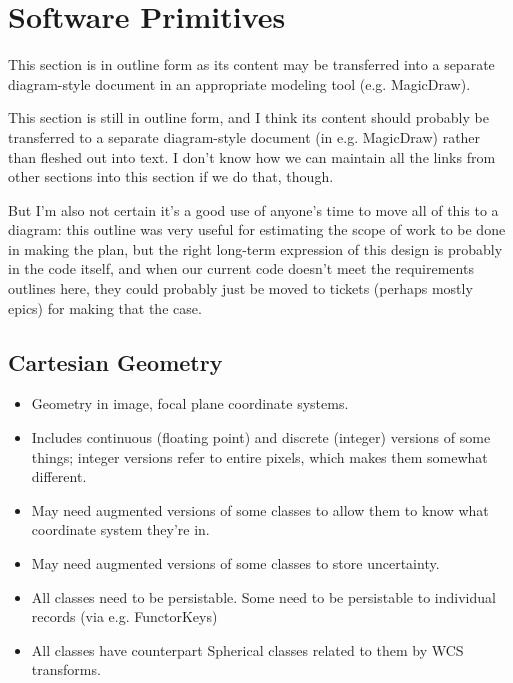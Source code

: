 \section{Software Primitives}
\label{sec:software-primitives}

This section is in outline form as its content may be transferred into a separate diagram-style document in an appropriate modeling tool (e.g. MagicDraw).

\begin{draftnote}[JFB]
This section is still in outline form, and I think its content should probably be transferred to a separate diagram-style document (in e.g. MagicDraw) rather than fleshed out into text.  I don't know how we can maintain all the links from other sections into this section if we do that, though.

But I'm also not certain it's a good use of anyone's time to move all of this to a diagram: this outline was very useful for estimating the scope of work to be done in making the plan, but the right long-term expression of this design is probably in the code itself, and when our current code doesn't meet the requirements outlines here, they could probably just be moved to tickets (perhaps mostly epics) for making that the case.
\end{draftnote}

\subsection{Cartesian Geometry}
\label{sec:spCartesianGeometry}

\begin{itemize}
\item Geometry in image, focal plane coordinate systems.
\item Includes continuous (floating point) and discrete (integer) versions of some things; integer versions refer to entire pixels, which makes them somewhat different.
\item May need augmented versions of some classes to allow them to know what coordinate system they're in.
\item May need augmented versions of some classes to store uncertainty.
\item All classes need to be persistable.  Some need to be persistable to individual records (via e.g. FunctorKeys)
\item All classes have counterpart Spherical classes related to them by WCS transforms.
\end{itemize}

